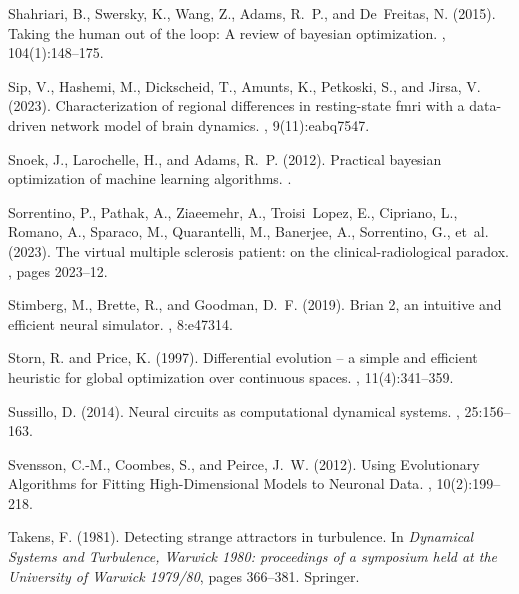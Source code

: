 \documentclass[12pt]{article}
\begin{document}
\begin{thebibliography}{}
Shahriari, B., Swersky, K., Wang, Z., Adams, R.~P., and De~Freitas, N. (2015).
\newblock Taking the human out of the loop: A review of bayesian optimization.
, 104(1):148--175.

Sip, V., Hashemi, M., Dickscheid, T., Amunts, K., Petkoski, S., and Jirsa, V.
  (2023).
\newblock Characterization of regional differences in resting-state fmri with a
  data-driven network model of brain dynamics.
, 9(11):eabq7547.

Snoek, J., Larochelle, H., and Adams, R.~P. (2012).
\newblock Practical bayesian optimization of machine learning algorithms.
.

Sorrentino, P., Pathak, A., Ziaeemehr, A., Troisi~Lopez, E., Cipriano, L.,
  Romano, A., Sparaco, M., Quarantelli, M., Banerjee, A., Sorrentino, G.,
  et~al. (2023).
\newblock The virtual multiple sclerosis patient: on the clinical-radiological
  paradox.
, pages 2023--12.

Stimberg, M., Brette, R., and Goodman, D.~F. (2019).
\newblock Brian 2, an intuitive and efficient neural simulator.
, 8:e47314.

Storn, R. and Price, K. (1997).
\newblock Differential evolution -- a simple and efficient heuristic for global
  optimization over continuous spaces.
, 11(4):341--359.

Sussillo, D. (2014).
\newblock Neural circuits as computational dynamical systems.
, 25:156--163.

Svensson, C.-M., Coombes, S., and Peirce, J.~W. (2012).
\newblock Using {Evolutionary} {Algorithms} for {Fitting} {High}-{Dimensional}
  {Models} to {Neuronal} {Data}.
, 10(2):199--218.

Takens, F. (1981).
\newblock Detecting strange attractors in turbulence.
\newblock In {\em Dynamical Systems and Turbulence, Warwick 1980: proceedings
  of a symposium held at the University of Warwick 1979/80}, pages 366--381.
  Springer.


\end{thebibliography}
\end{document}
